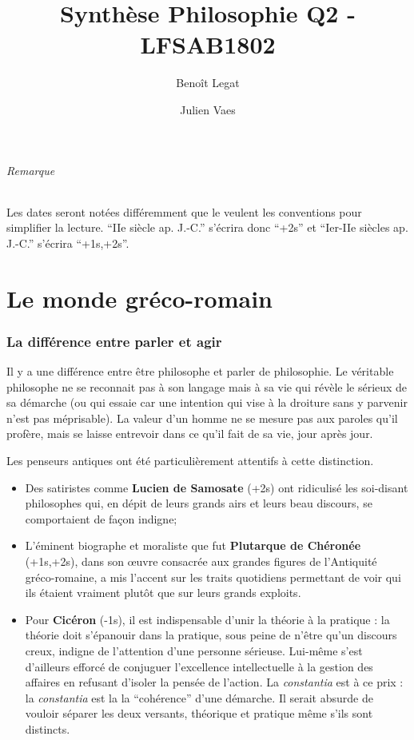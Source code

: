 \documentclass[11pt,a4paper]{article} %
\title{Synthèse Philosophie Q2 - LFSAB1802}
\author{Benoît Legat \and Julien Vaes}
\begin{document}
\maketitle

\paragraph{Remarque}
Les dates seront notées différemment que le veulent les conventions pour simplifier la lecture.
``IIe siècle ap. J.-C.'' s'écrira donc ``+2s'' et
``Ier-IIe siècles ap. J.-C.'' s'écrira ``+1s,+2s''.

\part{Le monde gréco-romain}

\section{La différence entre parler et agir}
Il y a une différence entre être philosophe et parler de philosophie.
Le véritable philosophe ne se reconnait pas à son langage mais à sa vie qui révèle le sérieux de sa démarche
(ou qui essaie car une intention qui vise à la droiture sans y parvenir n'est pas méprisable).
La valeur d'un homme ne se mesure pas aux paroles qu'il profère,
mais se laisse entrevoir dans ce qu'il fait de sa vie, jour après jour.

Les penseurs antiques ont été particulièrement attentifs à cette distinction.
\begin{itemize}
	\item Des satiristes comme \textbf{Lucien de Samosate} (+2s) ont ridiculisé les soi-disant philosophes qui,
		en dépit de leurs grands airs et leurs beau discours, se comportaient de façon indigne;
	\item L'éminent biographe et moraliste que fut \textbf{Plutarque de Chéronée} (+1s,+2s),
		dans son œuvre consacrée aux grandes figures de l'Antiquité gréco-romaine,
		a mis l'accent sur les traits quotidiens permettant de voir qui ils étaient vraiment plutôt que sur leurs grands exploits.
	\item Pour \textbf{Cicéron} (-1s), il est indispensable d'unir la théorie à la pratique :
		la théorie doit s'épanouir dans la pratique, sous peine de n'être qu'un discours
		creux, indigne de l'attention d'une personne sérieuse.
		Lui-même s'est d'ailleurs efforcé de
		conjuguer l'excellence intellectuelle à la gestion des affaires en refusant d'isoler la pensée
		de l'action. La \textit{constantia} est à ce prix : la \textit{constantia} est la
		la ``cohérence'' d'une démarche. Il serait absurde de vouloir séparer les deux versants, théorique et pratique
		même s'ils sont distincts.
\end{itemize}
\end{document}
